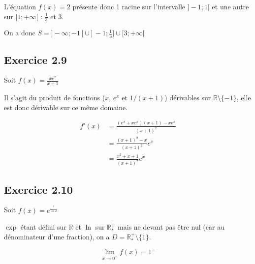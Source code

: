 \documentclass[a4paper,10pt]{report}
\begin{document}

L'équation $f(x)=2$ présente donc 1 racine sur l'intervalle $]-1 ; 1[$ et une autre sur $]1; +\infty[$ : $\frac{1}{3}$ et $3$.

On a donc $S = ]-\infty ; -1[ \cup ]-1 ; \frac{1}{3}] \cup [3 ; +\infty[$

\subsection*{Exercice 2.9}

Soit $f(x) = \frac{xe^x}{x+1}$

Il s'agit du produit de fonctions ($x$, $e^x$ et $1/(x+1)$) dérivables sur $\mathbb{R}\setminus\{-1\}$,
elle est donc dérivable sur ce même domaine. 

\begin{equation*}
	\begin{split}
		f'(x) &= \frac{(e^x + x e^x)(x+1)-x e^x}{(x+1)^2} \\
		      &= \frac{(x+1)^2-x}{(x+1)^2}e^x \\
		      &= \frac{x^2 + x + 1}{(x+1)^2}e^x
	\end{split}
\end{equation*}

\subsection*{Exercice 2.10}

Soit $f(x) = e^\frac{^1}{\ln x}$

$\exp$ étant défini sur $\mathbb{R}$ et $\ln$ sur $\mathbb{R}^{+}_{*}$ mais ne devant pas être nul (car au dénominateur d'une
fraction), on a $D = \mathbb{R}^{+}_{*}\setminus\{1\}$.

\begin{displaymath}
	\lim_{x \rightarrow 0^{+}} f(x) = 1^{-}
\end{displaymath}
\end{document}

